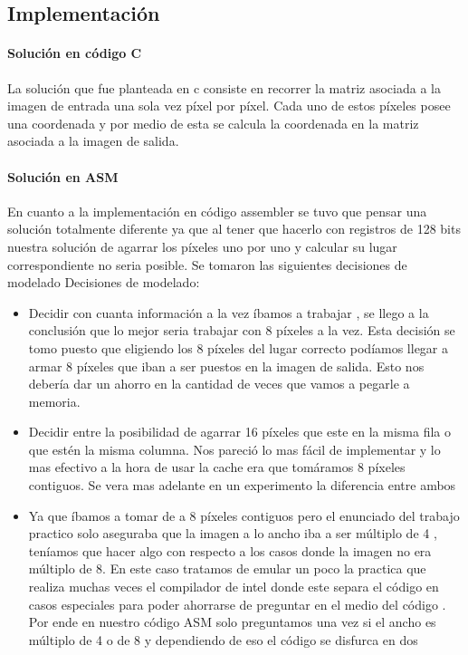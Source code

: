 \subsection{Implementación}
\paragraph{Solución en código C}
La solución que fue planteada en c consiste en recorrer la matriz asociada a la imagen de entrada una sola vez píxel por píxel. Cada uno de estos píxeles posee una coordenada y por medio de esta se calcula la coordenada en la matriz asociada a la imagen de salida. 


\paragraph{Solución en ASM}
En cuanto a la implementación en código assembler se tuvo que pensar una solución totalmente diferente ya que al tener que hacerlo con registros de 128 bits nuestra solución de agarrar los píxeles uno por uno y calcular su lugar correspondiente no seria posible. Se tomaron las siguientes decisiones de modelado Decisiones de modelado:
\begin{itemize}
\item Decidir con cuanta información a la vez íbamos a trabajar , se llego a la conclusión que lo mejor seria trabajar con 8 píxeles a la vez. Esta decisión se tomo puesto que eligiendo los 8 píxeles del lugar correcto podíamos llegar a armar 8 píxeles que iban a ser puestos en la imagen de salida. Esto nos debería dar un ahorro en la cantidad de veces que vamos a pegarle a memoria.
\item Decidir entre la posibilidad de agarrar 16 píxeles que este en la misma fila o que estén la misma columna. Nos pareció lo mas fácil de implementar y lo mas efectivo a la hora de usar la cache era que tomáramos 8 píxeles contiguos. Se vera mas adelante en un experimento la diferencia entre ambos
\item Ya que íbamos a tomar de a 8 píxeles contiguos pero el enunciado del trabajo practico solo aseguraba que la imagen a lo ancho iba a ser múltiplo de 4 , teníamos que hacer algo con respecto a los casos donde la imagen no era múltiplo de 8. En este caso tratamos de emular un poco la practica que realiza muchas veces el compilador de intel donde este separa el código en casos especiales para poder ahorrarse de preguntar en el medio del código . Por ende en nuestro código ASM solo preguntamos una vez si el ancho es múltiplo de 4 o de 8 y dependiendo de eso el código se disfurca en dos
\end{itemize}

